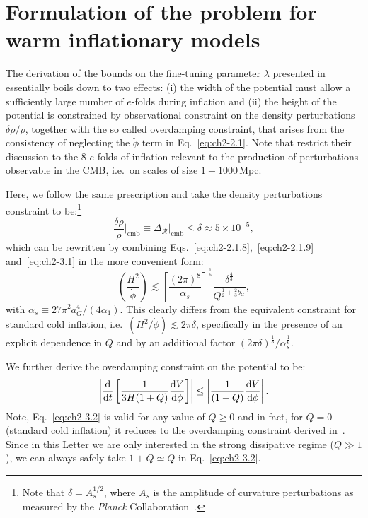 \section{Formulation of the problem for warm inflationary models}
\label{sec:ch2-3}

The derivation of the bounds on the fine-tuning parameter $\lambda$ presented in~\citep{Adams:1990pn} essentially boils down to two effects: (i) the width of the potential must allow a sufficiently large number of $e$-folds during inflation and (ii)
the height of the potential is constrained by observational constraint on the density perturbations $\delta\rho/\rho$, together with the so called overdamping constraint, that arises from the consistency of neglecting the $\ddot{\phi}$ term in Eq.~\ref{eq:ch2-2.1}.  Note that \citep{Adams:1990pn} restrict their discussion to the 8 $e$-folds of inflation relevant to the production of perturbations observable in the CMB, i.e.\ on scales of size $1-1000\,$Mpc.

Here, we follow the same prescription and take the density perturbations constraint to be:\footnote{Note that $\delta = A_s^{1/2}$, where $A_s$ is the amplitude of curvature perturbations as measured by the {\it Planck} Collaboration~\citep{Planck:2018nkj}.}
\begin{equation}
    \frac{\delta \rho}{\rho}\Big|_{\mathrm{\mathrm{cmb}}}\equiv \Delta_{\mathcal{R}}\Big|_{\mathrm{cmb}}\leq \delta\approx 5\times 10^{-5}, \label{eq:ch2-3.1}
\end{equation}
which can be rewritten by combining Eqs.~\ref{eq:ch2-2.1.8},~\ref{eq:ch2-2.1.9} and~\ref{eq:ch2-3.1} in the more convenient form:
\begin{equation}
    \left(\frac{H^2}{\Dot{\phi}}\right)\lesssim \left[\frac{(2\pi)^8}{\alpha_s}\right]^{\frac{1}{6}}\frac{\delta^{\frac{4}{3}}}{Q^{\frac{1}{2}+\frac{2}{3}b_G}}, \label{eq:ch2-3.3}
\end{equation}
with $\alpha_s\equiv 27\pi^2a_G^4/(4\alpha_1)$. This clearly differs from the equivalent constraint for standard cold inflation, i.e.\ $(H^2/\Dot{\phi})\lesssim 2\pi\delta$, specifically in the presence of an explicit dependence in $Q$ and by an additional factor $(2\pi\delta)^{\frac{1}{3}}/\alpha_s^{\frac{1}{6}}$.

We further derive the overdamping constraint on the potential to be:
\begin{equation}
    \left|\frac{{\rm d}}{{\rm d} t}\left[\frac{1}{3 H(1+Q)} \frac{{\rm d} V}{{\rm d} \phi}\right]\right| \leq\left|\frac{1}{(1+Q)}\frac{{\rm d} V}{{\rm d} \phi}\right|. \label{eq:ch2-3.2}
\end{equation}
Note, Eq.~\ref{eq:ch2-3.2} is valid for any value of $Q\geq 0$ and in fact, for $Q=0$ (standard cold inflation) it reduces to the overdamping constraint derived in~\citep{Adams:1990pn}. Since in this Letter we are only interested in the strong dissipative regime ($Q\gg1$), we can always safely take $1+Q\simeq Q$ in Eq.~\ref{eq:ch2-3.2}.

